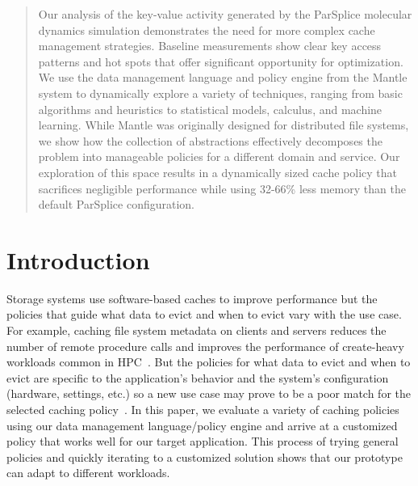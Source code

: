 \begin{abstract}

Our analysis of the key-value activity generated by the ParSplice molecular
dynamics simulation demonstrates the need for more complex cache management
strategies. Baseline measurements show clear key access patterns and hot spots
that offer significant opportunity for optimization. We use the data management
language and policy engine from the Mantle system to dynamically explore a
variety of techniques, ranging from basic algorithms and heuristics to
statistical models, calculus, and machine learning. While Mantle was originally
designed for distributed file systems, we show how the collection of
abstractions effectively decomposes the problem into manageable policies for a
different domain and service.  Our exploration of this space results in a
dynamically sized cache policy that sacrifices negligible performance while
using 32-66\% less memory than the default ParSplice configuration.

\end{abstract}

\section{Introduction}

Storage systems use software-based caches to improve performance but the
policies that guide what data to evict and when to evict vary with the use
case. For example, caching file system metadata on clients and servers reduces
the number of remote procedure calls and improves the performance of
create-heavy workloads common in HPC~\cite{ren:sc2014-indexfs,
patil:fast2011-giga+}. But the policies for what data to evict and when to
evict are specific to the application's behavior and the system's configuration
(hardware, settings, etc.) so a new use case may prove to be a poor match for
the selected caching
policy~\cite{xiao:socc15-shardfs,brandt:msst2003-lh,sevilla:sc15-mantle,
weil:sc2004-dyn-metadata, weil:osdi2006-ceph}. In this paper, we evaluate a
variety of caching policies using our data management language/policy engine and
arrive at a customized policy that works well for our target application.  This
process of trying general policies and quickly iterating to a customized
solution shows that our prototype can adapt to different workloads.


